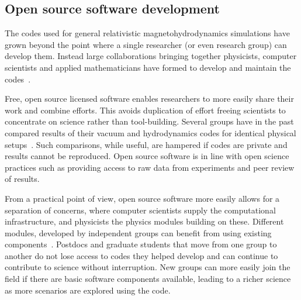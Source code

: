 \documentclass[12pt]{article}
\begin{document}
%
%

\subsection{Open source software development}

The codes used
for general relativistic magnetohydrodynamics simulations
have grown beyond the point where a single researcher (or even research group)
can
develop them. Instead large collaborations bringing together physicists,
computer scientists and applied mathematicians have formed to develop and
maintain the
codes~\cite{2012CQGra..29k5001L,SXS:web,astrocodelib:web}.

Free, open source licensed software enables researchers to more easily
share their work and combine efforts.
This avoids duplication of effort freeing scientists to concentrate on science
rather than tool-building. 
%
Several groups have in the past compared results of their vacuum
and hydrodynamics codes
for identical physical setups~\cite{Babiuc:2007vr,
Baiotti:2010ka}. Such comparisons, while useful, are hampered if codes are
private and results cannot be reproduced. Open source software is in
line with open science practices such as providing access to raw data from
experiments and peer review of results. 

From a practical point of view, open source software more easily allows for a
separation of concerns, where computer scientists supply the computational
infrastructure, and physicists the physics modules building on these.
Different modules, developed by independent groups can benefit from using
existing components~\cite{2012CQGra..29k5001L}. Postdocs and graduate students that
move from one group to another do not lose access to codes they helped
develop and can continue to contribute to science without interruption.
New groups can more easily join the field if there are basic software
components available, leading to a richer science as more scenarios are
explored using the code. 
\end{document}
